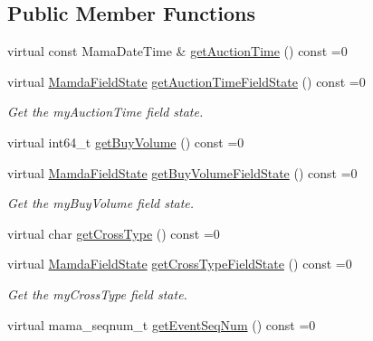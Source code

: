 \subsection*{Public Member Functions}
\begin{CompactItemize}
\item 
virtual const Mama\-Date\-Time \& \hyperlink{classWombat_1_1MamdaOrderImbalanceRecap_55fb46c69e5aff98475169a4ddbb4ae6}{get\-Auction\-Time} () const =0
\item 
virtual \hyperlink{namespaceWombat_93aac974f2ab713554fd12a1fa3b7d2a}{Mamda\-Field\-State} \hyperlink{classWombat_1_1MamdaOrderImbalanceRecap_bb7f149026c917f1a04059c7bf2cc22f}{get\-Auction\-Time\-Field\-State} () const =0
\begin{CompactList}\small\item\em Get the my\-Auction\-Time field state. \item\end{CompactList}\item 
virtual int64\_\-t \hyperlink{classWombat_1_1MamdaOrderImbalanceRecap_f5d0601b43944ff04a80d98601a041da}{get\-Buy\-Volume} () const =0
\item 
virtual \hyperlink{namespaceWombat_93aac974f2ab713554fd12a1fa3b7d2a}{Mamda\-Field\-State} \hyperlink{classWombat_1_1MamdaOrderImbalanceRecap_869bc84756e63963c4b47e0c63ae92c4}{get\-Buy\-Volume\-Field\-State} () const =0
\begin{CompactList}\small\item\em Get the my\-Buy\-Volume field state. \item\end{CompactList}\item 
virtual char \hyperlink{classWombat_1_1MamdaOrderImbalanceRecap_9ecbfc392c96d8fadb6fda3a0b976de1}{get\-Cross\-Type} () const =0
\item 
virtual \hyperlink{namespaceWombat_93aac974f2ab713554fd12a1fa3b7d2a}{Mamda\-Field\-State} \hyperlink{classWombat_1_1MamdaOrderImbalanceRecap_be84e053623cff05c86acfabcb0a77a8}{get\-Cross\-Type\-Field\-State} () const =0
\begin{CompactList}\small\item\em Get the my\-Cross\-Type field state. \item\end{CompactList}\item 
virtual mama\_\-seqnum\_\-t \hyperlink{classWombat_1_1MamdaOrderImbalanceRecap_f49f74200cc7ca60a7509f4801a1f74e}{get\-Event\-Seq\-Num} () const =0
\item 

\end{CompactItemize}
